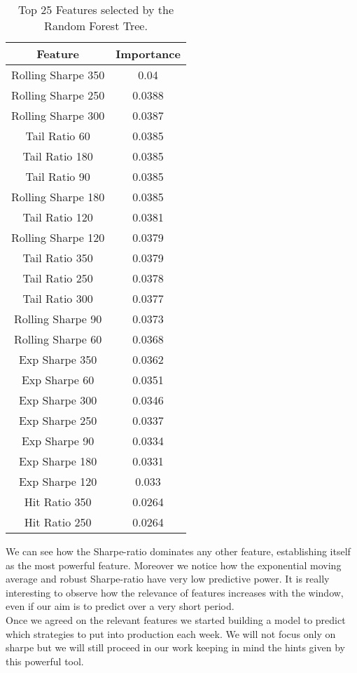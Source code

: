 \begin{table}
	\centering
	\begin{tabular}{c|c}
		Feature & Importance \\\hline \hline
		Rolling Sharpe 350 & 0.04 \\ 
		Rolling Sharpe 250 & 0.0388 \\ 
		Rolling Sharpe 300 & 0.0387 \\ 
		Tail Ratio 60 & 0.0385 \\ 
		Tail Ratio 180 & 0.0385 \\ 
		Tail Ratio 90 & 0.0385 \\ 
		Rolling Sharpe 180 & 0.0385 \\ 
		Tail Ratio 120 & 0.0381 \\ 
		Rolling Sharpe 120 & 0.0379 \\ 
		Tail Ratio 350 & 0.0379 \\ 
		Tail Ratio 250 & 0.0378 \\ 
		Tail Ratio 300 & 0.0377 \\ 
		Rolling Sharpe 90 & 0.0373 \\ 
		Rolling Sharpe 60 & 0.0368 \\ 
		Exp Sharpe 350 & 0.0362 \\ 
		Exp Sharpe 60 & 0.0351 \\ 
		Exp Sharpe 300 & 0.0346 \\ 
		Exp Sharpe 250 & 0.0337 \\ 
		Exp Sharpe 90 & 0.0334 \\ 
		Exp Sharpe 180 & 0.0331 \\ 
		Exp Sharpe 120 & 0.033 \\ 
		Hit Ratio 350 & 0.0264 \\ 
		Hit Ratio 250 & 0.0264 \\ 
	\end{tabular}
	\caption{ Top 25 Features selected by the Random Forest Tree.}
	\label{table:feature}
\end{table}


We can see how the Sharpe-ratio dominates any other feature, establishing itself as the most powerful feature. Moreover we notice how the exponential moving average and robust Sharpe-ratio have very low predictive power. It is really interesting to observe how the relevance of features increases with the window, even if our aim is to predict over a very short period.\\
Once we agreed on the relevant features we started building a model to predict which strategies to put into production each week. We will not focus only on sharpe but we will still proceed in our work keeping in mind the hints given by this powerful tool.\\
